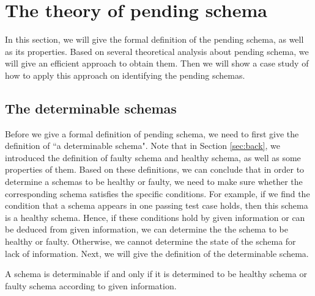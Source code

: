 
\section{The theory of pending schema}\label{sec:pending}
In this section, we will give the formal definition of the pending schema, as well as its properties. Based on several theoretical analysis about pending schema, we will give an efficient approach to obtain them. Then we will show a case study of  how to apply this approach on identifying the pending schemas.

\subsection{The determinable schemas}\label{sec:pending:determinable}
Before we give a formal definition of pending schema, we need to first give the definition of ``a determinable schema". Note that in Section \ref{sec:back}, we introduced the definition of faulty schema and healthy schema, as well as some properties of them. Based on these definitions, we can conclude that in order to determine a schemas to be healthy or faulty, we need to make sure whether the corresponding schema satisfies the specific conditions. For example, if we find the condition that a schema appears in one passing test case holds, then this schema is a healthy schema. Hence, if these conditions hold by given information or can be deduced from given information, we can determine the the schema to be healthy or faulty. Otherwise, we cannot determine the state of the schema for lack of information. Next, we will give the definition of the determinable schema.


\begin{definition}\label{de:deteminable}
A schema is determinable if and only if it is determined to be healthy schema or faulty schema according to given information.
\end{definition}

